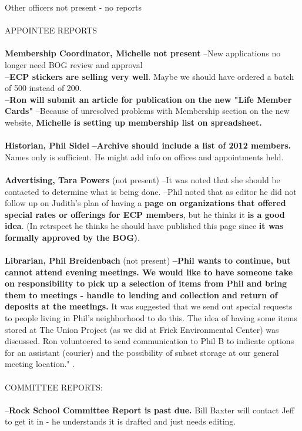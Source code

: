 \documentclass[10pt,a4paper]{article}
\begin{document}
\begin{multicols}{2}
Other officers not present - no reports
\\
\\
{\Large APPOINTEE REPORTS}
\\
\\
{\bf Membership Coordinator, Michelle not present}
--New applications no longer need BOG review and approval\\
\textbf{--ECP stickers are selling very well}. Maybe we should have ordered a batch of 500 instead of 200.\\
\textbf{--Ron will submit an article for publication on the new "Life Member Cards"}
--Because of unresolved problems with Membership section on the new website, \textbf{Michelle is setting up membership list on spreadsheet.}
\\
\\
\textbf{Historian, Phil Sidel}
\textbf{--Archive should include a list of 2012 members.}  Names only is sufficient.  He might add info on offices and appointments held.
\\
\\
\textbf{Advertising, Tara Powers} (not present)
--It was noted that she should be contacted to determine what is being done.
--Phil noted that as editor he did not follow up on Judith's plan of having a \textbf{page on organizations that offered special rates or offerings for ECP members}, but he thinks it \textbf{is a good idea}.  (In retrspect he thinks he should have published this page since \textbf{it was formally approved by the BOG)}.
\\
\\
\textbf{Librarian, Phil Breidenbach} (not present)
\textbf{--Phil wants to continue, but cannot attend evening meetings.  We would like to have someone take on responsibility to pick up a selection of items from Phil and bring them to meetings - handle to lending and collection and return of deposits at the meetings.
}It was suggested that we send out special requests to people living in Phil's neighborhood to do this.
The idea of having some items stored at The Union Project (as we did at Frick Environmental Center) was discussed.  Ron volunteered to send communication to Phil B to indicate options for an assistant (courier) and the possibility of subset storage at our general meeting location."
.
\\
\\
{\Large COMMITTEE REPORTS:}
\\
\\
--\textbf{Rock School Committee Report is past due.}  Bill Baxter will contact Jeff to get it in - he understands it is drafted and just needs editing.

\end{multicols}
\end{document}
